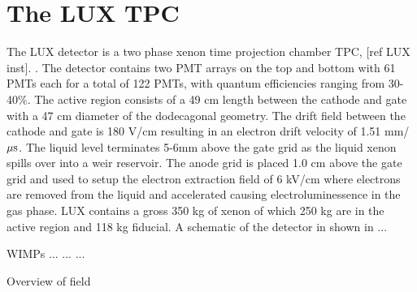 \section{The LUX TPC}

The LUX detector is a two phase xenon time projection chamber TPC,  [ref LUX inst]. . The detector contains two PMT arrays on the top and bottom with 61 PMTs each for a total of 122 PMTs, with quantum efficiencies ranging from 30-40\%. The active region consists of a 49 cm length between the cathode and gate with a 47 cm diameter of the dodecagonal geometry. The drift field between the cathode and gate is 180 V/cm resulting in an electron drift velocity of 1.51 mm/$\rm \mu s$. The liquid level terminates 5-6mm above the gate grid as the liquid xenon spills over into a weir reservoir. The anode grid is placed 1.0 cm above the gate grid and used to setup the electron extraction field of 6 kV/cm where electrons are removed from the liquid and accelerated causing electroluminessence in the gas phase.  LUX contains a gross 350 kg of xenon of which 250 kg are in the active region and 118 kg fiducial. A schematic of the detector in shown in ...

	WIMPs ... ... ...




Overview of field

